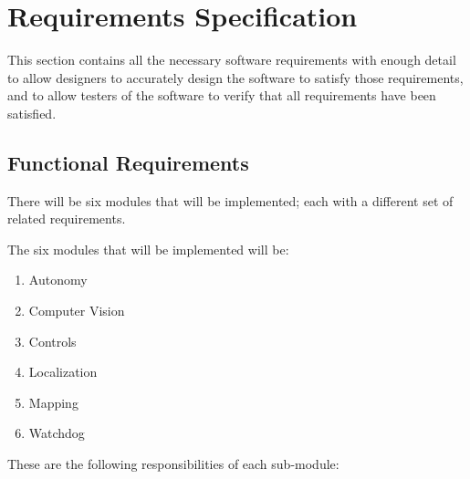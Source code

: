 \section{Requirements Specification}
\label{sec:specification}

This section contains all the necessary software requirements with enough
detail to allow designers to accurately design the software to satisfy those
requirements, and to allow testers of the software to verify that all
requirements have been satisfied.
\par

\subsection{Functional Requirements}
\label{sec:functional}

There will be six modules that will be implemented; each with a different set
of related requirements. 
\par

The six modules that will be implemented will be: 

\begin{enumerate}
    \item Autonomy 
    \item Computer Vision 
    \item Controls 
    \item Localization 
    \item Mapping 
    \item Watchdog 
\end{enumerate}

These are the following responsibilities of each sub-module:


